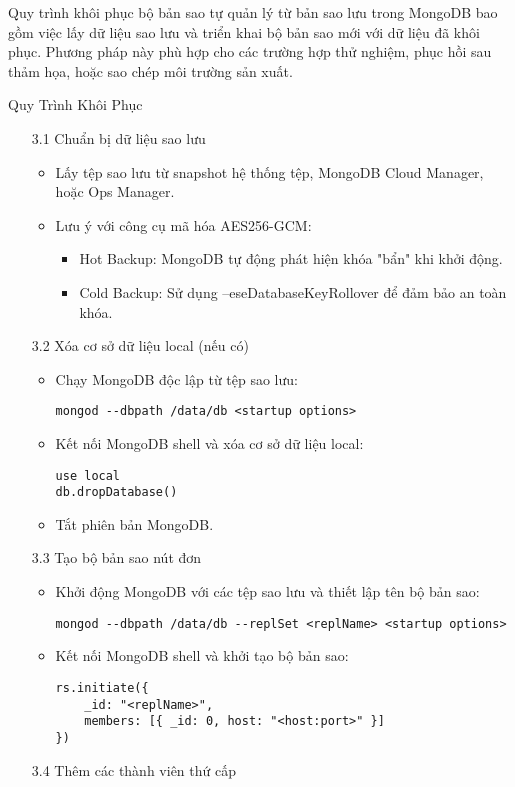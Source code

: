 \begin{enumerate}
    \hspace{1cm}Quy trình khôi phục bộ bản sao tự quản lý từ bản sao lưu trong MongoDB bao gồm việc lấy dữ liệu sao lưu và triển khai bộ bản sao mới với dữ liệu đã khôi phục. Phương pháp này phù hợp cho các trường hợp thử nghiệm, phục hồi sau thảm họa, hoặc sao chép môi trường sản xuất.

    \hspace{1cm} Quy Trình Khôi Phục
    \begin{enumerate}
        \item[3.1] Chuẩn bị dữ liệu sao lưu
        \begin{itemize}
            \item Lấy tệp sao lưu từ snapshot hệ thống tệp, MongoDB Cloud Manager, hoặc Ops Manager.
            \item Lưu ý với công cụ mã hóa AES256-GCM:
            \begin{itemize}
                \item Hot Backup: MongoDB tự động phát hiện khóa "bẩn" khi khởi động.
                \item Cold Backup: Sử dụng --eseDatabaseKeyRollover để đảm bảo an toàn khóa.
            \end{itemize}
        \end{itemize}
        \item[3.2] Xóa cơ sở dữ liệu local (nếu có)
        \begin{itemize}
            \item Chạy MongoDB độc lập từ tệp sao lưu:
\begin{lstlisting}
mongod --dbpath /data/db <startup options>
\end{lstlisting}
            \item Kết nối MongoDB shell và xóa cơ sở dữ liệu local:
\begin{lstlisting}
use local
db.dropDatabase()
\end{lstlisting}
            \item Tắt phiên bản MongoDB.
        \end{itemize}
        \item[3.3] Tạo bộ bản sao nút đơn
        \begin{itemize}
            \item Khởi động MongoDB với các tệp sao lưu và thiết lập tên bộ bản sao:
\begin{lstlisting}
mongod --dbpath /data/db --replSet <replName> <startup options>
\end{lstlisting}
            \item Kết nối MongoDB shell và khởi tạo bộ bản sao:
\begin{lstlisting}
rs.initiate({
    _id: "<replName>",
    members: [{ _id: 0, host: "<host:port>" }]
})
\end{lstlisting}
        \end{itemize}
        \item[3.4] Thêm các thành viên thứ cấp 


\end{enumerate}
\end{enumerate}
